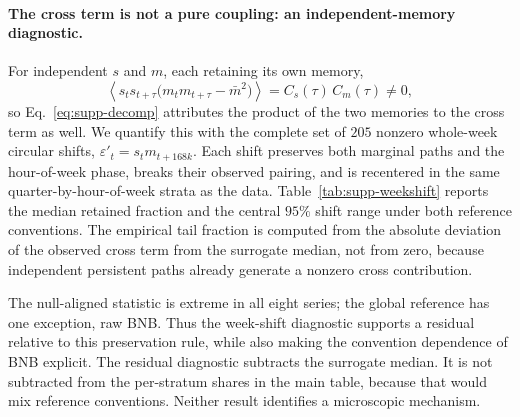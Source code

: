 \documentclass[aps,pre,onecolumn,superscriptaddress,floatfix,nofootinbib]{revtex4-2}
\newcommand{\avg}[1]{\left\langle #1 \right\rangle}
\newcommand{\eps}{\varepsilon}
\begin{document}
\paragraph*{The cross term is not a pure coupling: an independent-memory diagnostic.}
\label{sec:supp-attribution}
For independent $s$ and $m$, each retaining its own memory,
\begin{equation}
  \avg{s_t s_{t+\tau}\bigl(m_t m_{t+\tau}-\bar m^{2}\bigr)}
   =C_s(\tau)\,C_m(\tau)\neq0 ,
  \label{eq:supp-crossid}
\end{equation}
so Eq.~\eqref{eq:supp-decomp} attributes the product of the two memories to the
cross term as well. We quantify this with the complete set of $205$ nonzero
whole-week circular shifts, $\eps'_t=s_t m_{t+168k}$. Each shift preserves both
marginal paths and the hour-of-week phase, breaks their observed pairing, and
is recentered in the same quarter-by-hour-of-week strata as the data. Table~\ref{tab:supp-weekshift}
reports the median retained fraction and the central $95\%$ shift range under
both reference conventions. The empirical tail fraction is computed from the
absolute deviation of the observed cross term from the surrogate median, not
from zero, because independent persistent paths already generate a nonzero
cross contribution.

The null-aligned statistic is extreme in all eight series; the global reference
has one exception, raw BNB. Thus the week-shift diagnostic supports a residual
relative to this preservation rule, while also making the convention dependence
of BNB explicit. The residual diagnostic subtracts the surrogate median. It is
not subtracted from the per-stratum shares in the main table, because that would
mix reference conventions. Neither result identifies a microscopic mechanism.
\end{document}
